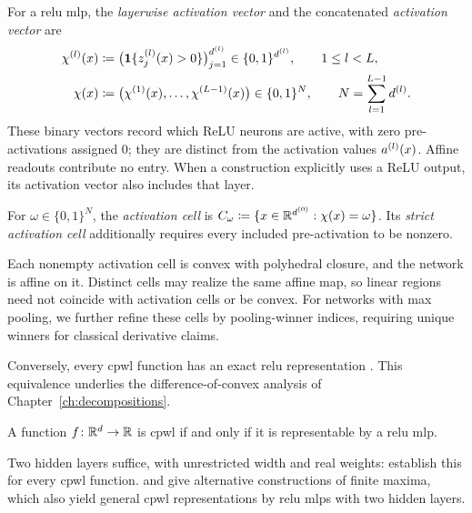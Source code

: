\begin{definition}\label{def:activation_vector}
For a \ac{relu} \ac{mlp}, the \emph{layerwise activation vector} and the concatenated \emph{activation vector} are
\begin{align}
 \chi^{(l)}(x)&\coloneqq\bigl(\mathbf{1}\{z^{(l)}_j(x)>0\}\bigr)_{j=1}^{d^{(l)}}\in\{0,1\}^{d^{(l)}},\qquad 1\le l<L,\notag\\
 \chi(x)&\coloneqq\bigl(\chi^{(1)}(x),\ldots,\chi^{(L-1)}(x)\bigr)\in\{0,1\}^{N},\qquad N=\sum_{l=1}^{L-1}d^{(l)}.\label{eq:activation_vector}
\end{align}
These binary vectors record which ReLU neurons are active, with zero pre-activations assigned $0$; they are distinct from the activation values $a^{(l)}(x)$. Affine readouts contribute no entry. When a construction explicitly uses a ReLU output, its activation vector also includes that layer.

For $\omega\in\{0,1\}^{N}$, the \emph{activation cell} is $C_\omega\coloneqq\{x\in\mathbb{R}^{d^{(0)}}:\chi(x)=\omega\}$. Its \emph{strict activation cell} additionally requires every included pre-activation to be nonzero.
\end{definition}
Each nonempty activation cell is convex with polyhedral closure, and the network is affine on it. Distinct cells may realize the same affine map, so linear regions need not coincide with activation cells or be convex. For networks with max pooling, we further refine these cells by pooling-winner indices, requiring unique winners for classical derivative claims.

Conversely, every \ac{cpwl} function has an exact \ac{relu} representation \parencite{Arora2018}. This equivalence underlies the difference-of-convex analysis of Chapter~\ref{ch:decompositions}.

\begin{theoremenv}\label{thm:cpwl_relu_equivalence}
A function $f \colon \mathbb{R}^{d} \to \mathbb{R}$ is \ac{cpwl} if and only if it is representable by a \ac{relu} \ac{mlp}.\end{theoremenv}

Two hidden layers suffice, with unrestricted width and real weights: \textcite{Brunck2026TwoReLULayers} establish this for every \ac{cpwl} function. \textcite{Zimmermann2026Caterpillar} and \textcite{TallavarjulaRastegar2026TwoHiddenLayers} give alternative constructions of finite maxima, which also yield general \ac{cpwl} representations by \ac{relu} \acp{mlp} with two hidden layers.

